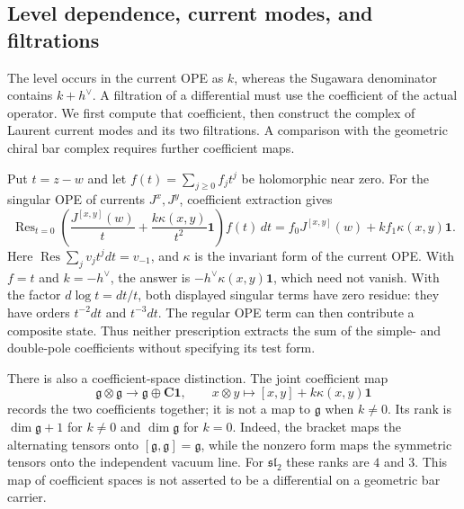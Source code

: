 \subsection{Level dependence, current modes, and filtrations}
\label{subsec:km-mode-filtrations}

The level occurs in the current OPE as $k$, whereas the Sugawara denominator
contains $k+h^\vee$.  A filtration of a differential must use the coefficient
of the actual operator.  We first compute that coefficient, then construct
the complex of Laurent current modes and its two filtrations.  A comparison
with the geometric chiral bar complex requires further coefficient maps.

\begin{example}
\label{ex:km-critical-residue}
Put $t=z-w$ and let $f(t)=\sum_{j\ge0}f_jt^j$ be holomorphic near zero.
For the singular OPE of currents $J^x,J^y$, coefficient extraction gives
\[
\operatorname{Res}_{t=0}
 \left(\frac{J^{[x,y]}(w)}t+\frac{k\kappa(x,y)}{t^2}\mathbf1\right)f(t)\,dt
=f_0J^{[x,y]}(w)+kf_1\kappa(x,y)\mathbf1.
\]
Here $\operatorname{Res}\sum_jv_jt^jdt=v_{-1}$, and $\kappa$ is the invariant
form of the current OPE.  With $f=t$ and $k=-h^\vee$, the answer is
$-h^\vee\kappa(x,y)\mathbf1$, which need not vanish.
With the factor $d\log t=dt/t$, both displayed singular terms have zero residue:
they have orders $t^{-2}dt$ and $t^{-3}dt$.  The regular OPE term can then
contribute a composite state.  Thus neither prescription extracts the sum
of the simple- and double-pole coefficients without specifying its test form.

There is also a coefficient-space distinction.  The joint coefficient map
\[
\mathfrak g\otimes\mathfrak g\longrightarrow\mathfrak g\oplus\mathbf C\mathbf1,
\qquad x\otimes y\longmapsto[x,y]+k\kappa(x,y)\mathbf1
\]
records the two coefficients together; it is not a map to $\mathfrak g$ when
$k\ne0$.  Its rank is $\dim\mathfrak g+1$ for $k\ne0$ and
$\dim\mathfrak g$ for $k=0$.  Indeed, the bracket maps the alternating tensors
onto $[\mathfrak g,\mathfrak g]=\mathfrak g$, while the nonzero form maps the
symmetric tensors onto the independent vacuum line.  For $\mathfrak{sl}_2$
these ranks are $4$ and $3$.  This map of coefficient spaces is not asserted
to be a differential on a geometric bar carrier.
\end{example}

